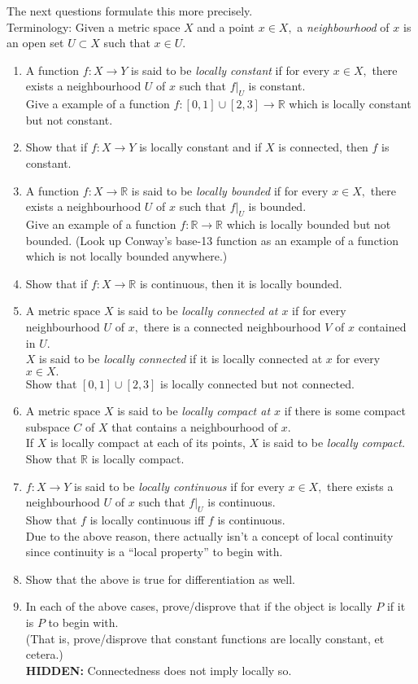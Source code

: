 \documentclass[12pt]{article}
\theoremstyle{definition}
\numberwithin{thm}{section}
\newcommand{\hint}[1]{\textbf{HIDDEN:} {\color[rgb]{0.95, 0.95, 0.95}#1}}
\begin{document}
The next questions formulate this more precisely.\\
Terminology: Given a metric space $X$ and a point $x \in X,$ a \emph{neighbourhood} of $x$ is an open set $U \subset X$ such that $x \in U.$
\begin{enumerate}
	\item A function $f:X\to Y$ is said to be \emph{locally constant} if for every $x \in X,$ there exists a neighbourhood $U$ of $x$ such that $f|_U$ is constant.\\
	Give a example of a function $f:[0, 1] \cup [2, 3] \to \mathbb{R}$ which is locally constant but not constant.
	\item Show that if $f:X \to Y$ is locally constant and if $X$ is connected, then $f$ is constant.
	\item A function $f:X \to \mathbb{R}$ is said to be \emph{locally bounded} if for every $x \in X,$ there exists a neighbourhood $U$ of $x$ such that $f|_U$ is bounded.\\
	Give an example of a function $f:\mathbb{R} \to \mathbb{R}$ which is locally bounded but not bounded. (Look up Conway's base-13 function as an example of a function which is not locally bounded anywhere.)
	\item Show that if $f:X\to\mathbb{R}$ is continuous, then it is locally bounded.
	\item A metric space $X$ is said to be \emph{locally connected at $x$} if for every neighbourhood $U$ of $x,$ there is a connected neighbourhood $V$ of $x$ contained in $U.$\\
	$X$ is said to be \emph{locally connected} if it is locally connected at $x$ for every $x \in X.$\\
	Show that $[0, 1]\cup[2, 3]$ is locally connected but not connected.
	\item A metric space $X$ is said to be \emph{locally compact at $x$} if there is some compact subspace $C$ of $X$ that contains a neighbourhood of $x.$\\
	If $X$ is locally compact at each of its points, $X$ is said to be \emph{locally compact.}\\
	Show that $\mathbb{R}$ is locally compact.
	\item $f:X\to Y$ is said to be \emph{locally continuous} if for every $x \in X,$ there exists a neighbourhood $U$ of $x$ such that $f|_U$ is continuous.\\
	Show that $f$ is locally continuous iff $f$ is continuous.\\
	Due to the above reason, there actually isn't a concept of local continuity since continuity is a ``local property'' to begin with.
	\item Show that the above is true for differentiation as well.
	\item In each of the above cases, prove/disprove that if the object is locally $P$ if it is $P$ to begin with.\\
	(That is, prove/disprove that constant functions are locally constant, et cetera.)\\
	\hint{Connectedness does not imply locally so.}
\end{enumerate}
\end{document}
